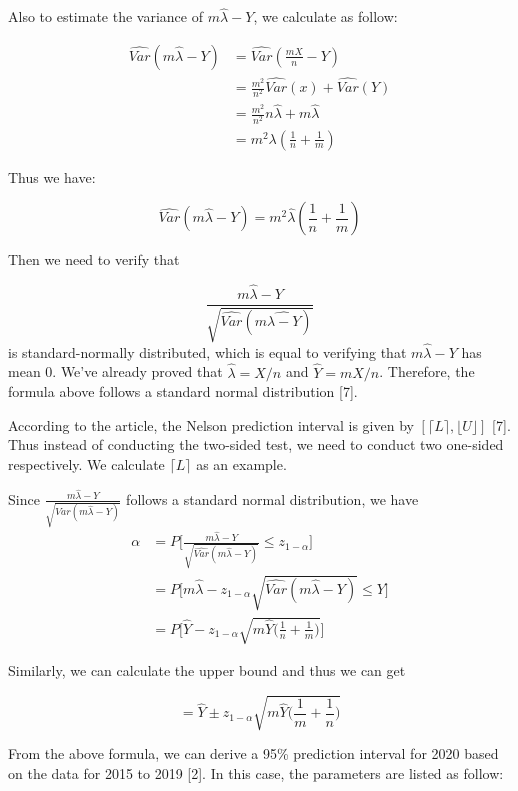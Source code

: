 \documentclass[a4paper]{article}
\begin{document}
Also to estimate the variance of $m\hat{\lambda}-Y$, we calculate as follow:

\begin{align*}
\hat{Var}(m\hat{\lambda}-Y)&=\hat{Var}(\frac{mX}{n}-Y)\\
&=\frac{m^2}{n^2}\hat{Var}(x)+\hat{Var}(Y)\\
&=\frac{m^2}{n^2}n\hat{\lambda}+m\hat{\lambda}\\
&=m^2\lambda(\frac{1}{n}+\frac{1}{m})
\end{align*}

Thus we have:

\begin{equation}
\hat{Var}(m\hat{\lambda}-Y)=m^2\hat{\lambda}(\frac{1}{n}+\frac{1}{m})
\end{equation}

Then we need to verify that

$$\frac{m\hat{\lambda}-Y}{\sqrt{\hat{Var}(m\hat{\lambda-Y})}}$$
is standard-normally distributed, which is equal to verifying that $m\hat{\lambda}-Y$ has mean 0. We've already proved that $\hat{\lambda}=X/n$ and $\hat{Y}=mX/n$. Therefore, the formula above follows a standard normal distribution [7].

According to the article, the Nelson prediction interval is given by $[\lceil L \rceil,\lfloor U\rfloor]$ [7]. Thus instead of conducting the two-sided test, we need to conduct two one-sided respectively. We calculate $\lceil L\rceil$ as an example.

Since $\frac{m\hat{\lambda}-Y}{\sqrt{\hat{Var}(m\hat{\lambda}-Y)}}$ follows a standard normal distribution, we have 
\begin{align*}
\alpha&=P\bigg[\frac{m\hat{\lambda}-Y}{\sqrt{\hat{Var}(m\hat{\lambda}-Y)}}\leqslant z_{1-\alpha}\bigg]\\
&=P\bigg[m\hat{\lambda}-z_{1-\alpha}\sqrt{\hat{Var}(m\hat{\lambda}-Y)}\leqslant Y\bigg]\\
&=P\bigg[\hat{Y}-z_{1-\alpha}\sqrt{m\hat{Y}\bigg(\frac{1}{n}+\frac{1}{m}\bigg)}\bigg]
\end{align*}

Similarly, we can calculate the upper bound and thus we can get

\begin{equation}
[L,U]=\hat{Y}\pm z_{1-\alpha}\sqrt{m\hat{Y}\bigg(\frac{1}{m}+\frac{1}{n}\bigg)}
\end{equation}

	From the above formula, we can derive a 95\% prediction interval for 2020 based on the data for 2015 to 2019 [2]. In this case, the parameters are listed as follow:
	
\end{document}
